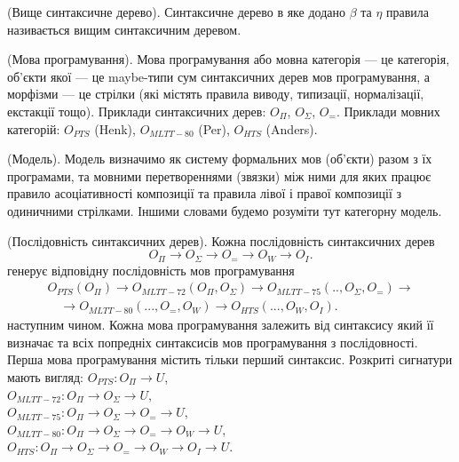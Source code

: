 \begin{definition} (Вище синтаксичне дерево).
Синтаксичне дерево в яке додано $\beta$ та $\eta$ правила називається
вищим синтаксичним деревом.
\end{definition}

\begin{definition} (Мова програмування).
Мова програмування або мовна категорія --- це категорія,
об’єкти якої --- це maybe-типи сум синтаксичних дерев мов програмування,
  а морфізми --- це стрілки (які містять правила виводу, типизації, нормалізації, екстакції тощо).
Приклади синтаксичних дерев: $O_\Pi$, $O_\Sigma$, $O_=$.
Приклади мовних категорій: $O_{PTS}$ (Henk), $O_{MLTT-80}$ (Per), $O_{HTS}$ (Anders).
\end{definition}

\begin{definition} (Модель).
Модель визначимо як систему формальних мов (об'єкти) разом з їх програмами,
та мовними перетвореннями (звязки) між ними для яких працює правило асоціативності
композиції та правила лівої і правої композиції з одиничними стрілками.
Іншими словами будемо розуміти тут категорну модель.
\end{definition}

\begin{definition} (Послідовність синтаксичних дерев). Кожна послідовність
синтаксичних дерев
\begin{equation}
O_{\Pi} \rightarrow O_{\Sigma} \rightarrow O_{=} \rightarrow O_{W} \rightarrow O_{I}.
\end{equation}
генерує відповідну послідовність мов програмування
\begin{equation}
\begin{split}
O_{PTS}(O_\Pi) \rightarrow O_{MLTT-72}(O_\Pi,O_\Sigma) \rightarrow O_{MLTT-75}(..,O_\Sigma,O_=) \rightarrow \\
 \quad \rightarrow O_{MLTT-80}(...,O_=,O_W) \rightarrow O_{HTS}(...,O_{W},O_I).
\end{split}
\end{equation}
наступним чином. Кожна мова програмування залежить
від синтаксису який її визначає
та всіх попредніх синтаксисів мов програмування з послідовності.
Перша мова програмування містить тільки перший синтаксис.
Розкриті сигнатури мають вигляд:
$O_{PTS}: O_\Pi \rightarrow U$, \\
$O_{MLTT-72}: O_\Pi \rightarrow O_\Sigma \rightarrow U$, \\
$O_{MLTT-75}: O_\Pi \rightarrow O_\Sigma \rightarrow O_= \rightarrow U$, \\
$O_{MLTT-80}: O_\Pi \rightarrow O_\Sigma \rightarrow O_= \rightarrow O_W \rightarrow U$, \\
$O_{HTS}: O_\Pi \rightarrow O_\Sigma \rightarrow O_= \rightarrow O_W \rightarrow O_I \rightarrow U$.
\end{definition}

